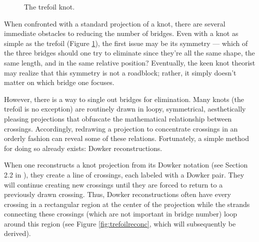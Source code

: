 \documentclass[titlepage,11pt]{article}
\begin{document}
\begin{figure}[h!]
    \centering
    \vspace{-2.3em}
    \caption{The trefoil knot.}
    \label{fig:trefoil}
\end{figure}

\noindent When confronted with a standard projection of a knot, there are several immediate obstacles to reducing the number of bridges. Even with a knot as simple as the trefoil (Figure \ref{fig:trefoil}), the first issue may be its symmetry --- which of the three bridges should one try to eliminate since they're all the same shape, the same length, and in the same relative position? Eventually, the keen knot theorist may realize that this symmetry is not a roadblock; rather, it simply doesn't matter on which bridge one focuses.\par
However, there is a way to single out bridges for elimination. Many knots (the trefoil is no exception) are routinely drawn in loopy, symmetrical, aesthetically pleasing projections that obfuscate the mathematical relationship between crossings. Accordingly, redrawing a projection to concentrate crossings in an orderly fashion can reveal some of these relations. Fortunately, a simple method for doing so already exists: Dowker reconstructions.\par
When one reconstructs a knot projection from its Dowker notation (see Section 2.2 in \cite{bib:knotnotes}), they create a line of crossings, each labeled with a Dowker pair. They will continue creating new crossings until they are forced to return to a previously drawn crossing. Thus, Dowker reconstructions often have every crossing in a rectangular region at the center of the projection while the strands connecting these crossings (which are not important in bridge number) loop around this region (see Figure \ref{fig:trefoilreconc}, which will subsequently be derived).\par
\end{document}
